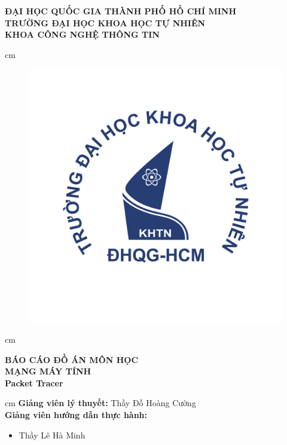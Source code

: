 \begin{titlepage}
\begin{mybox}
\begin{center}
\fontsize{12}{12}\selectfont
\textbf{ĐẠI HỌC QUỐC GIA THÀNH PHỐ HỒ CHÍ MINH}\\
\textbf{TRƯỜNG ĐẠI HỌC KHOA HỌC TỰ NHIÊN}\\
\textbf{KHOA CÔNG NGHỆ THÔNG TIN}
\end{center}
 cm
\begin{figure}[H]
\begin{center}
\includegraphics[scale=0.25]{../figures/logo}
\end{center}
\end{figure}
 cm
\begin{center}
\fontsize{18}{14}\selectfont
\textbf{BÁO CÁO ĐỒ ÁN MÔN HỌC}\\
\fontsize{26}{16}\selectfont
\textbf{MẠNG MÁY TÍNH}\\
\fontsize{18}{12}\selectfont
\textbf{Packet Tracer}
\end{center}
 cm
\fontsize{14}{12}\selectfont
\textbf{Giảng viên lý thuyết:} Thầy Đỗ Hoàng Cường\\
\textbf{Giảng viên hướng dẫn thực hành:}
\begin{itemize}
\item Thầy Lê Hà Minh

\end{itemize}
\end{mybox}
\end{titlepage}
